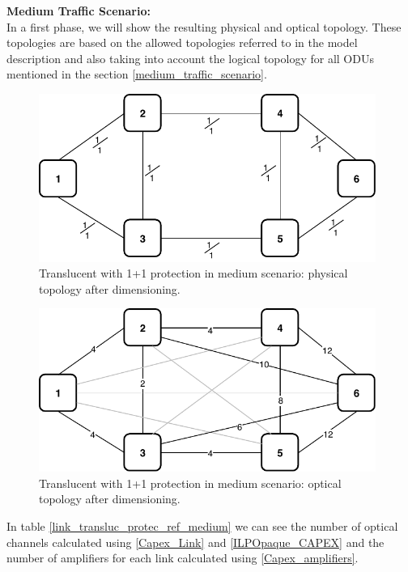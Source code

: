 \textbf{Medium Traffic Scenario:}\\

In a first phase, we will show the resulting physical and optical topology. These topologies are based on the allowed topologies referred to in the model description and also taking into account the logical topology for all ODUs mentioned in the section \ref{medium_traffic_scenario}.\\

\begin{figure}[h!]
\centering
\includegraphics[width=11cm]{sdf/ilp/translucent_protection/figures/physical_topology_medium}
\caption{Translucent with 1+1 protection in medium scenario: physical topology after dimensioning.}
\label{physical3_protectionmedium}
\end{figure}
\newpage
\begin{figure}[h!]
\centering
\includegraphics[width=11cm]{sdf/ilp/translucent_protection/figures/optical_topology_medium}
\caption{Translucent with 1+1 protection in medium scenario: optical topology after dimensioning.}
\label{optical3_protectionmedium}
\end{figure}

In table \ref{link_transluc_protec_ref_medium} we can see the number of optical channels calculated using \ref{Capex_Link} and \ref{ILPOpaque_CAPEX} and the number of amplifiers for each link calculated using \ref{Capex_amplifiers}.

